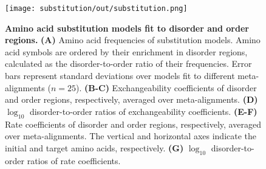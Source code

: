 


\begin{figure}[h!]
\texttt{[image: substitution/out/substitution.png]}
\centering
\caption{\textbf{Amino acid substitution models fit to disorder and order regions.}
\textbf{(A)} Amino acid frequencies of substitution models. Amino acid symbols are ordered by their enrichment in disorder regions, calculated as the disorder-to-order ratio of their frequencies. Error bars represent standard deviations over models fit to different meta-alignments ($n = 25$). \textbf{(B-C)} Exchangeability coefficients of disorder and order regions, respectively, averaged over meta-alignments. \textbf{(D)} $\log_{10}$ disorder-to-order ratios of exchangeability coefficients. \textbf{(E-F)} Rate coefficients of disorder and order regions, respectively, averaged over meta-alignments. The vertical and horizontal axes indicate the initial and target amino acids, respectively. \textbf{(G)} $\log_{10}$ disorder-to-order ratios of rate coefficients.}
\label{fig:substitution}
\end{figure}

